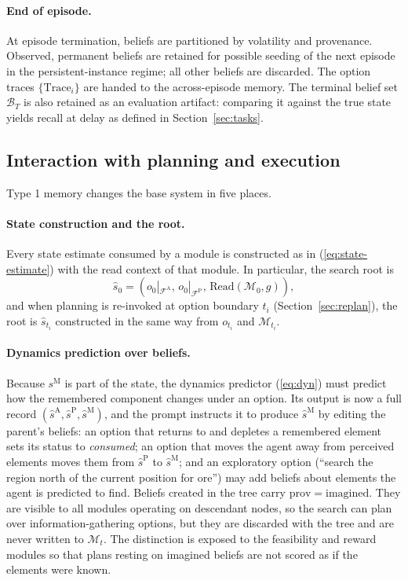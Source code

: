 \documentclass[11pt]{article}
\newcommand{\calF}{\mathcal{F}}
\newcommand{\calM}{\mathcal{M}}
\newcommand{\calB}{\mathcal{B}}
\newcommand{\shat}{\hat{s}}
\newcommand{\sM}{s^{\mathrm{M}}}
\newcommand{\FA}{\calF^{\mathrm{A}}}
\newcommand{\FP}{\calF^{\mathrm{P}}}
\newcommand{\Read}{\mathrm{Read}}
\newcommand{\Trace}{\mathrm{Trace}}
\newcommand{\prov}{\mathrm{prov}}
\begin{document}
\paragraph{End of episode.}
At episode termination, beliefs are partitioned by volatility and provenance. Observed, permanent beliefs are retained for possible seeding of the next episode in the persistent-instance regime; all other beliefs are discarded. The option traces $\{\Trace_i\}$ are handed to the across-episode memory. The terminal belief set $\calB_T$ is also retained as an evaluation artifact: comparing it against the true state yields recall at delay as defined in Section~\ref{sec:tasks}.

\subsection{Interaction with planning and execution}
\label{sec:type1-interaction}

Type 1 memory changes the base system in five places.

\paragraph{State construction and the root.}
Every state estimate consumed by a module is constructed as in (\ref{eq:state-estimate}) with the read context of that module. In particular, the search root is
\begin{equation}
\shat_0=(o_0|_{\FA},\,o_0|_{\FP},\,\Read(\calM_0,g)),
\end{equation}
and when planning is re-invoked at option boundary $t_i$ (Section~\ref{sec:replan}), the root is $\shat_{t_i}$ constructed in the same way from $o_{t_i}$ and $\calM_{t_i}$.

\paragraph{Dynamics prediction over beliefs.}
Because $\sM$ is part of the state, the dynamics predictor (\ref{eq:dyn}) must predict how the remembered component changes under an option. Its output is now a full record $(\hat{s}^{\mathrm{A}},\hat{s}^{\mathrm{P}},\hat{s}^{\mathrm{M}})$, and the prompt instructs it to produce $\hat{s}^{\mathrm{M}}$ by editing the parent's beliefs: an option that returns to and depletes a remembered element sets its status to \emph{consumed}; an option that moves the agent away from perceived elements moves them from $\hat{s}^{\mathrm{P}}$ to $\hat{s}^{\mathrm{M}}$; and an exploratory option (``search the region north of the current position for ore'') may add beliefs about elements the agent is predicted to find. Beliefs created in the tree carry $\prov=\mathrm{imagined}$. They are visible to all modules operating on descendant nodes, so the search can plan over information-gathering options, but they are discarded with the tree and are never written to $\calM_t$. The distinction is exposed to the feasibility and reward modules so that plans resting on imagined beliefs are not scored as if the elements were known.
\end{document}
